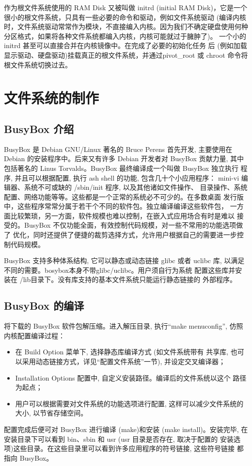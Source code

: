 作为根文件系统使用的 RAM Disk 又被叫做 initrd (initial RAM Disk)，它是一个
很小的根文件系统，只具有一些必要的命令和驱动，例如文件系统驱动 (编译内核
时，文件系统驱动常常作为模块，不直接编入内核。因为我们不确定硬盘使用何种
分区格式，如果将各种文件系统都编入内核，内核可能就过于臃肿了)。
一个小的 initrd 甚至可以直接合并在内核镜像中。在完成了必要的初始化任务
后 (例如加载显示驱动、硬盘驱动)挂载真正的根文件系统，并通过pivot\_root
或 chroot 命令将根文件系统切换过去。

\section{文件系统的制作}

\subsection{BusyBox 介绍}
BusyBox 是 Debian GNU/Linux 著名的 Bruce Perens 首先开发, 主要使用在
Debian 的安装程序中。后来又有许多 Debian 开发者对 BusyBox 贡献力量, 其中
包括著名的 Linus Torvalds。BusyBox 最终编译成一个叫做 BusyBox 独立执行
程序, 并且可以根据配置, 执行 ash shell 的功能, 包含几十个小应用程序：
mini-vi 编辑器、系统不可或缺的 /sbin/init 程序, 以及其他诸如文件操作、
目录操作、系统配置、网络功能等等。这些都是一个正常的系统必不可少的。在多数桌面
发行版中，这些程序常常分属于若干个不同的软件包。独立编译编译这些软件包，
一方面比较繁琐，另一方面，软件规模也难以控制，在嵌入式应用场合有时是难以
接受的。BusyBox 不仅功能全面，有效控制代码规模，对一些不常用的功能选项做了
优化，同时还提供了便捷的裁剪选择方式，允许用户根据自己的需要进一步控制代码规模。

BusyBox 支持多种体系结构, 它可以静态或动态链接 glibc 或者 uclibc 库, 
以满足不同的需要。bosybox本身不带glibc/uclibc。用户须自行为系统
配置这些库并安装在 /lib目录下。没有库支持的基本文件系统只能运行静态链接的
外部程序。

\subsection{BusyBox 的编译}
将下载的 BusyBox 软件包解压缩。进入解压目录, 执行``make menuconfig'', 
仿照内核配置编译过程：
\begin{itemize}
    \item 在 Build Option 菜单下, 选择静态库编译方式 (如文件系统带有
        共享库, 也可以采用动态链接方式，详见``配置文件系统''一节),
        并设定交叉编译器；
  \item Installation Options 配置中, 自定义安装路径。编译后的文件系统以这个
      路径为起点；
  \item 用户可以根据需要对文件系统的功能选项进行配置, 这样可以减少文件系统的
      大小, 以节省存储空间。
\end{itemize}
配置完成后便可对 BusyBox 进行编译 (make)和安装 (make install)。安装完毕, 
在安装目录下可以看到 bin、sbin 和 usr (usr 目录是否存在, 取决于配置的
安装选项)这些目录。在这些目录里可以看到许多应用程序的符号链接, 这些符号链接
都指向 BusyBox。

